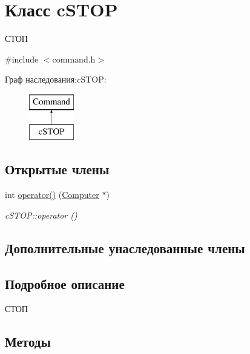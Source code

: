 \hypertarget{classc_s_t_o_p}{}\section{Класс c\+S\+T\+OP}
\label{classc_s_t_o_p}


СТОП  




{\ttfamily \#include $<$command.\+h$>$}

Граф наследования\+:c\+S\+T\+OP\+:\begin{figure}[H]
\begin{center}
\leavevmode
\includegraphics[height=2.000000cm]{classc_s_t_o_p}
\end{center}
\end{figure}
\subsection*{Открытые члены}
\begin{DoxyCompactItemize}
\item 
int \hyperlink{classc_s_t_o_p_ab9fc397331682767a4429257cdd14695}{operator()} (\hyperlink{class_computer}{Computer} $\ast$)
\begin{DoxyCompactList}\small\item\em c\+S\+T\+O\+P\+::operator () \end{DoxyCompactList}\end{DoxyCompactItemize}
\subsection*{Дополнительные унаследованные члены}


\subsection{Подробное описание}
СТОП 

\subsection{Методы}
\hypertarget{classc_s_t_o_p_ab9fc397331682767a4429257cdd14695}{}\label{classc_s_t_o_p_ab9fc397331682767a4429257cdd14695} 

